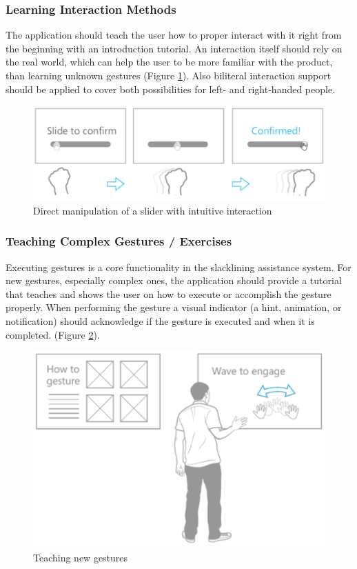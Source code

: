 \subsubsection{Learning Interaction Methods}
The application should teach the user how to proper interact with it right from the beginning with an introduction tutorial. An interaction itself should rely on the real world, which can help the user to be more familiar with the product, than learning unknown gestures (Figure \ref{fig:hciGuidelinesDynamicGesture}). Also biliteral interaction support should be applied to cover both possibilities for left- and right-handed people.
\begin{figure}[htb]
	\centering
	\begin{minipage}[t]{1\linewidth}
		\centering
		\includegraphics[width=0.6\linewidth]{Pictures/hciGuidelinesDynamicGesture}
		\caption{Direct manipulation of a slider with intuitive interaction~\cite{MicrosoftHIG2014-mh}}
		\label{fig:hciGuidelinesDynamicGesture}
	\end{minipage}
\end{figure}

\subsubsection{Teaching Complex Gestures / Exercises}
Executing gestures is a core functionality in the slacklining assistance system. For new gestures, especially complex ones, the application should provide a tutorial that teaches and shows the user on how to execute or accomplish the gesture properly. When performing the gesture a visual indicator (a hint, animation, or notification) should acknowledge if the gesture is executed and when it is completed. (Figure \ref{fig:hciGuidelinesTeachingMethods}).
\begin{figure}[htb]
	\centering
	\begin{minipage}[t]{1\linewidth}
		\centering
		\includegraphics[width=0.4\linewidth]{Pictures/hciGuidelinesTeachingMethods}
		\caption{Teaching new gestures~\cite{MicrosoftHIG2014-mh}}
		\label{fig:hciGuidelinesTeachingMethods}
	\end{minipage}
\end{figure}

